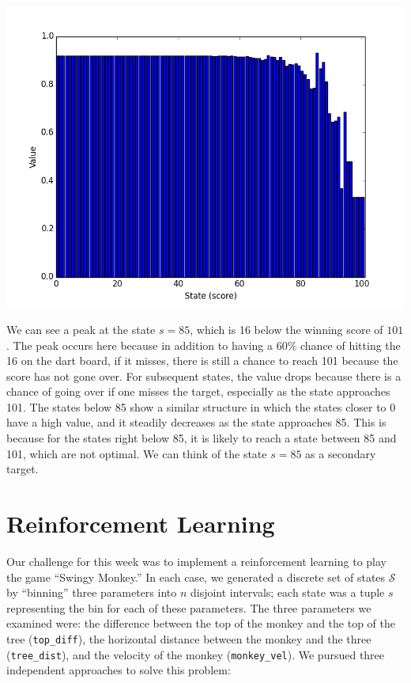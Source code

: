 \documentclass[11pt]{amsart}
\begin{document}
\includegraphics[width=14cm]{values_gamma1.png}

We can see a peak at the state $s=85$, which is 16 below the winning score of $101$. The peak occurs here because in addition to having a $60\%$ chance of hitting the 16 on the dart board, if it misses, there is still a chance to reach 101 because the score has not gone over. For subsequent states, the value drops because there is a chance of going over if one misses the target, especially as the state approaches 101. 
The states below 85 show a similar structure in which the states closer to 0 have a high value, and it steadily decreases as the state approaches 85. This is because for the states right below 85, it is likely to reach a state between 85 and 101, which are not optimal. We can think of the state $s=85$ as a secondary target.

\section{Reinforcement Learning}

Our challenge for this week was to implement a reinforcement learning to play
the game ``Swingy Monkey.'' In each case, we generated a discrete set of states $\mathcal{S}$ by ``binning'' three parameters into $n$ disjoint intervals; each state was a tuple $s$ representing the bin for each of these parameters. The three parameters we examined were: the difference between the top of the monkey and the top of the tree (\verb|top_diff|), the horizontal distance between the monkey and the three (\verb|tree_dist|), and the velocity of the monkey (\verb|monkey_vel|). We pursued three independent approaches to solve this 
problem:
\end{document}
